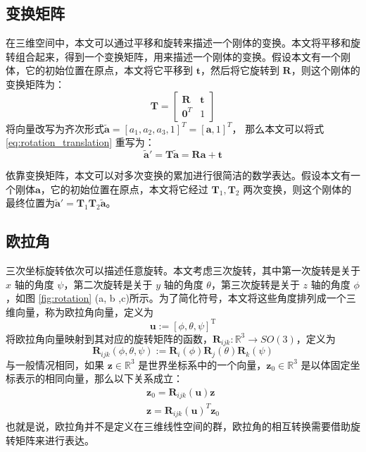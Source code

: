 \subsection{变换矩阵}
在三维空间中，本文可以通过平移和旋转来描述一个刚体的变换。本文将平移和旋转组合起来，得到一个变换矩阵，用来描述一个刚体的变换。假设本文有一个刚体，它的初始位置在原点，本文将它平移到 $\boldsymbol{t}$，然后将它旋转到 $\boldsymbol{R}$，则这个刚体的变换矩阵为：
\begin{equation}
    \boldsymbol{T} = 
    \begin{bmatrix}
    \boldsymbol{R} & \boldsymbol{t} \\
    \boldsymbol{0}^T & 1
    \end{bmatrix}
\end{equation}
将向量改写为齐次形式$\widetilde{\boldsymbol{a}} = [a_1, a_2, a_3, 1]^T = [\boldsymbol{a}, 1]^T$， 那么本文可以将式 \ref{eq:rotation_translation} 重写为：
\begin{equation}
    \widetilde{\boldsymbol{a}}' = \boldsymbol{T} \widetilde{\boldsymbol{a}} = \boldsymbol{R} \boldsymbol{a} + \boldsymbol{t}
\end{equation}  

依靠变换矩阵，本文可以对多次变换的累加进行很简洁的数学表达。假设本文有一个刚体$\boldsymbol{a}$，它的初始位置在原点，本文将它经过 $\boldsymbol{T}_1, \boldsymbol{T}_2$ 两次变换，则这个刚体的最终位置为$\widetilde{\boldsymbol{a}}' = \boldsymbol{T}_1 \boldsymbol{T}_2 \widetilde{\boldsymbol{a}}$。

\subsection{欧拉角}
三次坐标旋转依次可以描述任意旋转。本文考虑三次旋转，其中第一次旋转是关于 $x$ 轴的角度 $\psi$，第二次旋转是关于 $y$ 轴的角度 $\theta$，第三次旋转是关于 $z$ 轴的角度 $\phi$，如图 \ref{fig:rotation} (a, b ,c)所示。为了简化符号，本文将这些角度排列成一个三维向量，称为欧拉角向量，定义为 
\begin{equation}
    \boldsymbol{u} := [\phi, \theta, \psi]^\text{T}
\end{equation}
将欧拉角向量映射到其对应的旋转矩阵的函数，$\boldsymbol{R}_{ijk} : \mathbb{R}^3 \to SO(3)$，定义为
\begin{equation}
    \boldsymbol{R}_{ijk}(\phi, \theta, \psi) := \boldsymbol{R}_i(\phi)\boldsymbol{R}_j(\theta)\boldsymbol{R}_k(\psi)
\end{equation}
与一般情况相同，如果 $\boldsymbol{z} \in \mathbb{R}^3$ 是世界坐标系中的一个向量，$\boldsymbol{z}_0 \in \mathbb{R}^3$ 是以体固定坐标表示的相同向量，那么以下关系成立：
\begin{align}
    \boldsymbol{z}_0 = \boldsymbol{R}_{ijk}(\boldsymbol{u}) \boldsymbol{z} \\
    \boldsymbol{z} = \boldsymbol{R}_{ijk}(\boldsymbol{u})^T \boldsymbol{z}_0
\end{align}
也就是说，欧拉角并不是定义在三维线性空间的群，欧拉角的相互转换需要借助旋转矩阵来进行表达。

